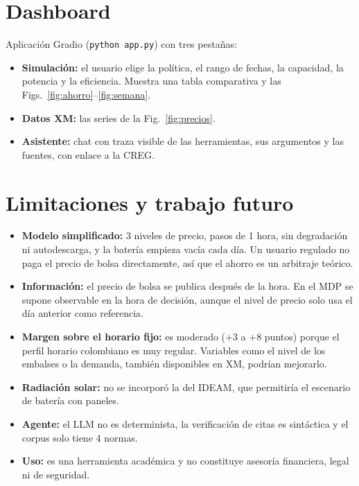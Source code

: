 \documentclass[10pt,letterpaper]{article}
\begin{document}
\section{Dashboard}

Aplicación Gradio (\texttt{python app.py}) con tres pestañas:
\begin{itemize}
  \item \textbf{Simulación:} el usuario elige la política, el rango de fechas, la capacidad, la potencia y la eficiencia.
        Muestra una tabla comparativa y las Figs.~\ref{fig:ahorro}--\ref{fig:semana}.
  \item \textbf{Datos XM:} las series de la Fig.~\ref{fig:precios}.
  \item \textbf{Asistente:} chat con traza visible de las herramientas, sus argumentos y las fuentes, con enlace a la CREG.
\end{itemize}

\section{Limitaciones y trabajo futuro}

\begin{itemize}
  \item \textbf{Modelo simplificado:} 3 niveles de precio, pasos de 1 hora, sin degradación ni autodescarga, y la batería
        empieza vacía cada día. Un usuario regulado no paga el precio de bolsa directamente, así que el ahorro es un
        arbitraje teórico.
  \item \textbf{Información:} el precio de bolsa se publica después de la hora. En el MDP se supone observable en la hora
        de decisión, aunque el nivel de precio solo usa el día anterior como referencia.
  \item \textbf{Margen sobre el horario fijo:} es moderado (+3 a +8 puntos) porque el perfil horario colombiano es muy regular.
        Variables como el nivel de los embalses o la demanda, también disponibles en XM, podrían mejorarlo.
  \item \textbf{Radiación solar:} no se incorporó la del IDEAM, que permitiría el escenario de batería con paneles.
  \item \textbf{Agente:} el LLM no es determinista, la verificación de citas es sintáctica y el corpus solo tiene 4 normas.
  \item \textbf{Uso:} es una herramienta académica y no constituye asesoría financiera, legal ni de seguridad.
\end{itemize}
\end{document}

